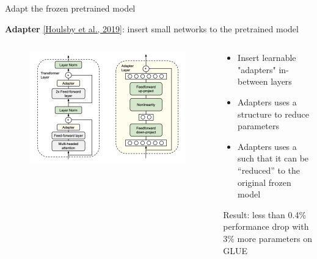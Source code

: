 \documentclass[usenames,dvipsnames,notes,11pt,aspectratio=169,hyperref={colorlinks=true, linkcolor=blue}]{beamer}
\begin{document}
\begin{frame}
    {Adapt the frozen pretrained model}

    \textbf{Adapter} \href{https://arxiv.org/pdf/1902.00751.pdf}{[Houlsby et al., 2019]}: insert small networks to the pretrained model \\[1em]

    \begin{columns}
        \begin{column}{0.4\textwidth}
    \begin{figure}
        \includegraphics[width=\textwidth]{figures/adapter}
    \end{figure}
    \end{column}
        \begin{column}{0.6\textwidth}
            \begin{itemize}
                \item Insert learnable "adapters" in-between layers
                \item Adapters uses a  structure to reduce parameters
                \item Adapters uses a  \pause such that it can be ``reduced'' to the original frozen model
            \end{itemize}
            Result: less than 0.4\% performance drop with 3\% more parameters on GLUE
        \end{column}
    \end{columns}
\end{frame}
\end{document}
